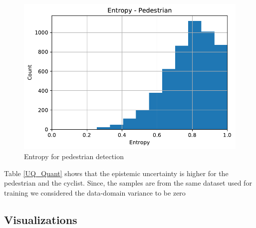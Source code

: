 \documentclass[10pt,twocolumn,letterpaper]{article}
\begin{document}
\begin{figure}[!htbp]
        \centering
		\includegraphics[scale = 0.4]{images/Part-Bayesian F_Pointnet_Results/Entropy_Pedestrian.pdf}
        \caption[Extracted frustum point cloud after Normalization]{Entropy for pedestrian detection}
        \label{fig:Pedestrian_Entropy}
\end{figure}
Table \ref{UQ_Quant} shows that the epistemic uncertainty is higher for the pedestrian and the cyclist. Since, the samples are from the same dataset used for training we considered the data-domain variance to be zero
\subsection{Visualizations}
\end{document}
